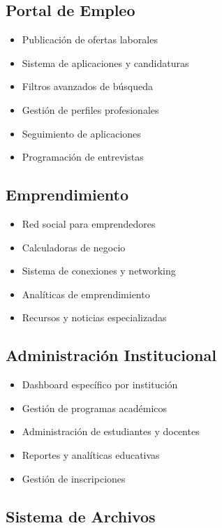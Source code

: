 \documentclass[12pt,a4paper]{article}
\begin{document}
\subsection{Portal de Empleo}

\begin{itemize}
    \item Publicación de ofertas laborales
    \item Sistema de aplicaciones y candidaturas
    \item Filtros avanzados de búsqueda
    \item Gestión de perfiles profesionales
    \item Seguimiento de aplicaciones
    \item Programación de entrevistas
\end{itemize}

\subsection{Emprendimiento}

\begin{itemize}
    \item Red social para emprendedores
    \item Calculadoras de negocio
    \item Sistema de conexiones y networking
    \item Analíticas de emprendimiento
    \item Recursos y noticias especializadas
\end{itemize}

\subsection{Administración Institucional}

\begin{itemize}
    \item Dashboard específico por institución
    \item Gestión de programas académicos
    \item Administración de estudiantes y docentes
    \item Reportes y analíticas educativas
    \item Gestión de inscripciones
\end{itemize}

\subsection{Sistema de Archivos}
\end{document}
